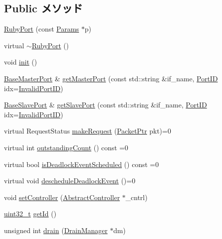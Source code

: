 \subsection*{Public メソッド}
\begin{DoxyCompactItemize}
\item 
\hyperlink{classRubyPort_a48daea2300eda2ed192847716fe85997}{RubyPort} (const \hyperlink{classRubyPort_a73ffda3b6b10849321fd359baf61eb3c}{Params} $\ast$p)
\item 
virtual \hyperlink{classRubyPort_ab94ca27fbdf091331d2703af1e73d8dc}{$\sim$RubyPort} ()
\item 
void \hyperlink{classRubyPort_a02fd73d861ef2e4aabb38c0c9ff82947}{init} ()
\item 
\hyperlink{classBaseMasterPort}{BaseMasterPort} \& \hyperlink{classRubyPort_adc4e675e51defbdd1e354dac729d0703}{getMasterPort} (const std::string \&if\_\-name, \hyperlink{base_2types_8hh_acef4d7d41cb21fdc252e20c04cd7bb8e}{PortID} idx=\hyperlink{base_2types_8hh_a65bf40f138cf863f0c5e2d8ca1144126}{InvalidPortID})
\item 
\hyperlink{classBaseSlavePort}{BaseSlavePort} \& \hyperlink{classRubyPort_ac918a145092d7514ebc6dbd952dceafb}{getSlavePort} (const std::string \&if\_\-name, \hyperlink{base_2types_8hh_acef4d7d41cb21fdc252e20c04cd7bb8e}{PortID} idx=\hyperlink{base_2types_8hh_a65bf40f138cf863f0c5e2d8ca1144126}{InvalidPortID})
\item 
virtual RequestStatus \hyperlink{classRubyPort_a596adbddbc1059f06e3989f743f2ed3e}{makeRequest} (\hyperlink{classPacket}{PacketPtr} pkt)=0
\item 
virtual int \hyperlink{classRubyPort_a366b0b3d8b8a08b7066f1b98c1b40b85}{outstandingCount} () const =0
\item 
virtual bool \hyperlink{classRubyPort_a24d37c70faaaf126b544c2d46ea70ce2}{isDeadlockEventScheduled} () const =0
\item 
virtual void \hyperlink{classRubyPort_ae635736b1bd64144a8f1fc5f42948b21}{descheduleDeadlockEvent} ()=0
\item 
void \hyperlink{classRubyPort_a0768dd0d813b0d71fd45a5deb1bd0294}{setController} (\hyperlink{classAbstractController}{AbstractController} $\ast$\_\-cntrl)
\item 
\hyperlink{Type_8hh_a435d1572bf3f880d55459d9805097f62}{uint32\_\-t} \hyperlink{classRubyPort_a0394d0753edf9da729ce700f110f650c}{getId} ()
\item 
unsigned int \hyperlink{classRubyPort_aa8a18d230dba7a674ac8a0b4f35bc36a}{drain} (\hyperlink{classDrainManager}{DrainManager} $\ast$dm)
\end{DoxyCompactItemize}
